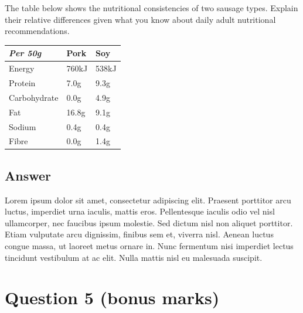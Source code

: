 \documentclass[
	12pt, %
]{../Template/fphw}
\begin{document}
\begin{problem}
	The table below shows the nutritional consistencies of two sausage types. Explain their relative differences given what you know about daily adult nutritional recommendations.
	
	\bigskip
    
	\begin{center}
		\begin{tabular}{l l l}
			\toprule
			\textit{Per 50g} & Pork & Soy \\
			\midrule
			Energy & 760kJ & 538kJ\\
			Protein & 7.0g & 9.3g\\
			Carbohydrate & 0.0g & 4.9g\\
			Fat & 16.8g & 9.1g\\
			Sodium & 0.4g & 0.4g\\
			Fibre & 0.0g & 1.4g\\
			\bottomrule
		\end{tabular}
	\end{center}
	
	\medskip
\end{problem}


\subsection*{Answer}

Lorem ipsum dolor sit amet, consectetur adipiscing elit. Praesent porttitor arcu luctus, imperdiet urna iaculis, mattis eros. Pellentesque iaculis odio vel nisl ullamcorper, nec faucibus ipsum molestie. Sed dictum nisl non aliquet porttitor. Etiam vulputate arcu dignissim, finibus sem et, viverra nisl. Aenean luctus congue massa, ut laoreet metus ornare in. Nunc fermentum nisi imperdiet lectus tincidunt vestibulum at ac elit. Nulla mattis nisl eu malesuada suscipit.


\section*{Question 5 (bonus marks)}
\end{document}
